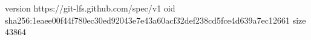 version https://git-lfs.github.com/spec/v1
oid sha256:1eaee00f44f780ec30ed92043e7e43a60acf32def238cd5fce4d639a7ec12661
size 43864
